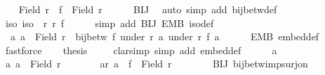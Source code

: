 \begin{isabellebody}
{\isacharminus}{\kern0pt}\isanewline
\ \ \isamarkupfalse%
\ {\isachardoublequoteopen}Field\ r{\isacharprime}{\kern0pt}\ {\isasymle}\ f\ {\isacharbackquote}{\kern0pt}\ {\isacharparenleft}{\kern0pt}Field\ r{\isacharparenright}{\kern0pt}{\isachardoublequoteclose}\isanewline
\ \ \ \ \isamarkupfalse%
\ BIJ\ \isamarkupfalse%
\ {\isacharparenleft}{\kern0pt}auto\ simp\ add{\isacharcolon}{\kern0pt}\ bij{\isacharunderscore}{\kern0pt}betw{\isacharunderscore}{\kern0pt}def{\isacharparenright}{\kern0pt}\isanewline
\ \ \isamarkupfalse%
\ \isamarkupfalse%
\ iso{\isacharcolon}{\kern0pt}\ {\isachardoublequoteopen}iso\ \ r\ r{\isacharprime}{\kern0pt}\ f{\isachardoublequoteclose}\isanewline
\ \ \ \ \isamarkupfalse%
\ {\isacharparenleft}{\kern0pt}simp\ add{\isacharcolon}{\kern0pt}\ BIJ\ EMB\ iso{\isacharunderscore}{\kern0pt}def{\isacharparenright}{\kern0pt}\isanewline
\ \ \isamarkupfalse%
\ {\isacharasterisk}{\kern0pt}{\isacharcolon}{\kern0pt}\ {\isachardoublequoteopen}{\isasymforall}a{\isachardot}{\kern0pt}\ a\ {\isasymin}\ Field\ r\ {\isasymlongrightarrow}\ bij{\isacharunderscore}{\kern0pt}betw\ f\ {\isacharparenleft}{\kern0pt}under\ r\ a{\isacharparenright}{\kern0pt}\ {\isacharparenleft}{\kern0pt}under\ r{\isacharprime}{\kern0pt}\ {\isacharparenleft}{\kern0pt}f\ a{\isacharparenright}{\kern0pt}{\isacharparenright}{\kern0pt}{\isachardoublequoteclose}\isanewline
\ \ \ \ \isamarkupfalse%
\ EMB\ embed{\isacharunderscore}{\kern0pt}def\ \isamarkupfalse%
\ fastforce\isanewline
\ \ \isamarkupfalse%
\ {\isacharquery}{\kern0pt}thesis\ \isanewline
\ \ \isamarkupfalse%
\ {\isacharparenleft}{\kern0pt}clarsimp\ simp\ add{\isacharcolon}{\kern0pt}\ embed{\isacharunderscore}{\kern0pt}def{\isacharparenright}{\kern0pt}\isanewline
\ \ \ \ \isamarkupfalse%
\ a\isanewline
\ \ \ \ \isamarkupfalse%
\ a{\isacharcolon}{\kern0pt}\ {\isachardoublequoteopen}a\ {\isasymin}\ Field\ r{\isacharprime}{\kern0pt}{\isachardoublequoteclose}\isanewline
\ \ \ \ \isamarkupfalse%
\ \isamarkupfalse%
\ ar{\isacharcolon}{\kern0pt}\ {\isachardoublequoteopen}a\ {\isasymin}\ f\ {\isacharbackquote}{\kern0pt}\ Field\ r{\isachardoublequoteclose}\isanewline
\ \ \ \ \ \ \isamarkupfalse%
\ BIJ\ bij{\isacharunderscore}{\kern0pt}betw{\isacharunderscore}{\kern0pt}imp{\isacharunderscore}{\kern0pt}surj{\isacharunderscore}{\kern0pt}on\ \isamarkupfalse%

\end{isabellebody}
